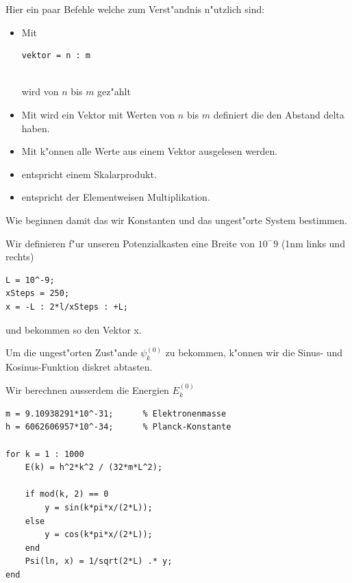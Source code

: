 \begin{refsection}
Hier ein paar Befehle welche zum Verst"andnis n"utzlich sind:
\begin{itemize}
\item Mit \\
\begin{lstlisting}vektor = n : m\end{lstlisting} \\
wird von $n$ bis $m$ gez"ahlt
\item Mit
wird ein Vektor mit Werten von $n$ bis $m$ definiert die den Abstand delta haben.
\item Mit
k"onnen alle Werte aus einem Vektor ausgelesen werden.
\item
entspricht einem Skalarprodukt.
\item
entspricht der Elementweisen Multiplikation.
\end{itemize}

Wie beginnen damit das wir Konstanten und das ungest"orte System bestimmen.

Wir definieren f"ur unseren Potenzialkasten eine Breite von $10^-9$ (1nm links und rechts)
\begin{lstlisting}[style=Matlab]
L = 10^-9;
xSteps = 250;
x = -L : 2*l/xSteps : +L;
\end{lstlisting}
und bekommen so den Vektor x.

Um die ungest"orten Zust"ande $\psi_k^{(0)}$ zu bekommen, k"onnen wir die Sinus- und Kosinus-Funktion diskret abtasten.

Wir berechnen ausserdem die Energien $E_k^{(0)}$

\begin{lstlisting}[style=Matlab]
m = 9.10938291*10^-31;		% Elektronenmasse
h = 6062606957*10^-34;		% Planck-Konstante

for k = 1 : 1000
    E(k) = h^2*k^2 / (32*m*L^2);
    
    if mod(k, 2) == 0
        y = sin(k*pi*x/(2*L));
    else
        y = cos(k*pi*x/(2*L));
    end
    Psi(ln, x) = 1/sqrt(2*L) .* y;
end
\end{lstlisting}


\end{refsection}
